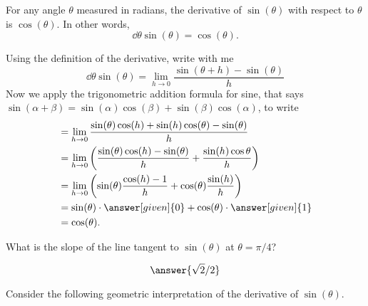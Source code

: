 \documentclass{ximera}
\begin{document}
\begin{theorem}\label{theorem:deriv sin}
For any angle $\theta$ measured in radians, the derivative of $\sin(\theta)$ with respect to $\theta$ is $\cos(\theta)$.  In other words, 
\[
\dd{\theta} \sin(\theta) = \cos(\theta).
\]
\begin{explanation}
Using the definition of the derivative, write with me
\[
\dd{\theta} \sin(\theta) = \lim_{h\to0} \frac{\sin(\theta+h)-\sin(\theta)}{h}
\]
Now we apply the trigonometric addition formula for sine, that says $\sin(\alpha+\beta) = \sin(\alpha)\cos(\beta)+\sin(\beta)\cos(\alpha)$, to write
\begin{align*}
  &= \lim_{h\to0} \frac{\sin(\theta)\cos(h)+\sin(h)\cos(\theta)-\sin(\theta)}{h}  \\
  &= \lim_{h\to0} \left(\frac{\sin(\theta)\cos(h)-\sin(\theta)}{h} + \frac{\sin(h)\cos{\theta}}{h} \right)\\
  &=\lim_{h\to0} \left(\sin (\theta)\frac{\cos(h) - 1}{h}+\cos(\theta)\frac{\sin(h)}{h}\right) \\
  &=\sin(\theta) \cdot \answer[given]{0} + \cos(\theta) \cdot \answer[given]{1}\\
  &= \cos(\theta). 
\end{align*}
\end{explanation}
\end{theorem}

\begin{question}
  What is the slope of the line tangent to $\sin(\theta)$ at $\theta =
  \pi/4$?
  \begin{prompt}
    \[
    \answer{\sqrt{2}/2}
    \]
  \end{prompt}
\end{question}

Consider the following geometric
interpretation of the derivative of $\sin(\theta)$.
\end{document}
